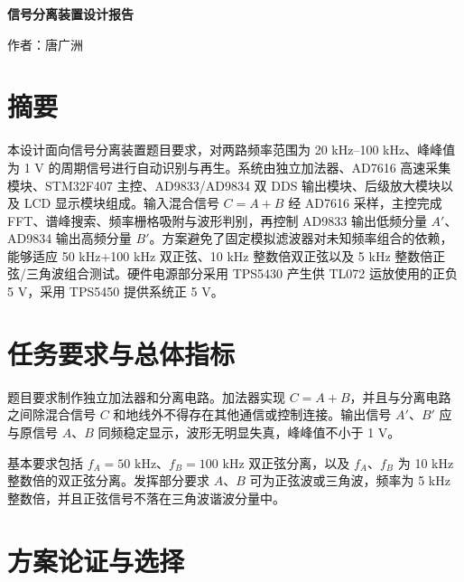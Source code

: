 \documentclass[UTF8,a4paper,zihao=-4]{ctexart}
\begin{document}
\begin{titlepage}
\thispagestyle{empty}
\centering
\vspace*{2.2cm}
{\bfseries 信号分离装置设计报告\par}
\vspace{0.8cm}
{ 作者：唐广洲\par}
\vfill
\end{titlepage}

\clearpage
\thispagestyle{plain}
\section*{摘要}
\noindent
本设计面向信号分离装置题目要求，对两路频率范围为 20 kHz--100 kHz、峰峰值为 1 V 的周期信号进行自动识别与再生。系统由独立加法器、AD7616 高速采集模块、STM32F407 主控、AD9833/AD9834 双 DDS 输出模块、后级放大模块以及 LCD 显示模块组成。输入混合信号 $C=A+B$ 经 AD7616 采样，主控完成 FFT、谱峰搜索、频率栅格吸附与波形判别，再控制 AD9833 输出低频分量 $A'$、AD9834 输出高频分量 $B'$。方案避免了固定模拟滤波器对未知频率组合的依赖，能够适应 50 kHz+100 kHz 双正弦、10 kHz 整数倍双正弦以及 5 kHz 整数倍正弦/三角波组合测试。硬件电源部分采用 TPS5430 产生供 TL072 运放使用的正负 5 V，采用 TPS5450 提供系统正 5 V。
\clearpage

\setcounter{page}{1}
\let\originsection\section
\renewcommand{\section}{\clearpage\originsection}

\section{任务要求与总体指标}

题目要求制作独立加法器和分离电路。加法器实现 $C=A+B$，并且与分离电路之间除混合信号 $C$ 和地线外不得存在其他通信或控制连接。输出信号 $A'$、$B'$ 应与原信号 $A$、$B$ 同频稳定显示，波形无明显失真，峰峰值不小于 1 V。

基本要求包括 $f_A=50\text{ kHz}$、$f_B=100\text{ kHz}$ 双正弦分离，以及 $f_A$、$f_B$ 为 10 kHz 整数倍的双正弦分离。发挥部分要求 $A$、$B$ 可为正弦波或三角波，频率为 5 kHz 整数倍，并且正弦信号不落在三角波谐波分量中。

\section{方案论证与选择}
\end{document}
